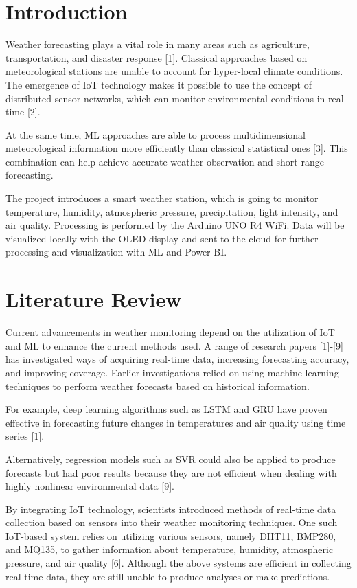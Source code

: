\documentclass[conference]{IEEEtran}
\begin{document}
\section{Introduction}

Weather forecasting plays a vital role in many areas such as agriculture, transportation, and disaster response [1]. Classical approaches based on meteorological stations are unable to account for hyper-local climate conditions. The emergence of IoT technology makes it possible to use the concept of distributed sensor networks, which can monitor environmental conditions in real time [2].

At the same time, ML approaches are able to process multidimensional meteorological information more efficiently than classical statistical ones [3]. This combination can help achieve accurate weather observation and short-range forecasting.

The project introduces a smart weather station, which is going to monitor temperature, humidity, atmospheric pressure, precipitation, light intensity, and air quality. Processing is performed by the Arduino UNO R4 WiFi. Data will be visualized locally with the OLED display and sent to the cloud for further processing and visualization with ML and Power BI.

\section{Literature Review}

Current advancements in weather monitoring depend on the utilization of IoT and ML to enhance the current methods used. A range of research papers [1]-[9] has investigated ways of acquiring real-time data, increasing forecasting accuracy, and improving coverage. Earlier investigations relied on using machine learning techniques to perform weather forecasts based on historical information.

For example, deep learning algorithms such as LSTM and GRU have proven effective in forecasting future changes in temperatures and air quality using time series [1].

Alternatively, regression models such as SVR could also be applied to produce forecasts but had poor results because they are not efficient when dealing with highly nonlinear environmental data [9].

By integrating IoT technology, scientists introduced methods of real-time data collection based on sensors into their weather monitoring techniques. One such IoT-based system relies on utilizing various sensors, namely DHT11, BMP280, and MQ135, to gather information about temperature, humidity, atmospheric pressure, and air quality [6]. Although the above systems are efficient in collecting real-time data, they are still unable to produce analyses or make predictions.
\end{document}
